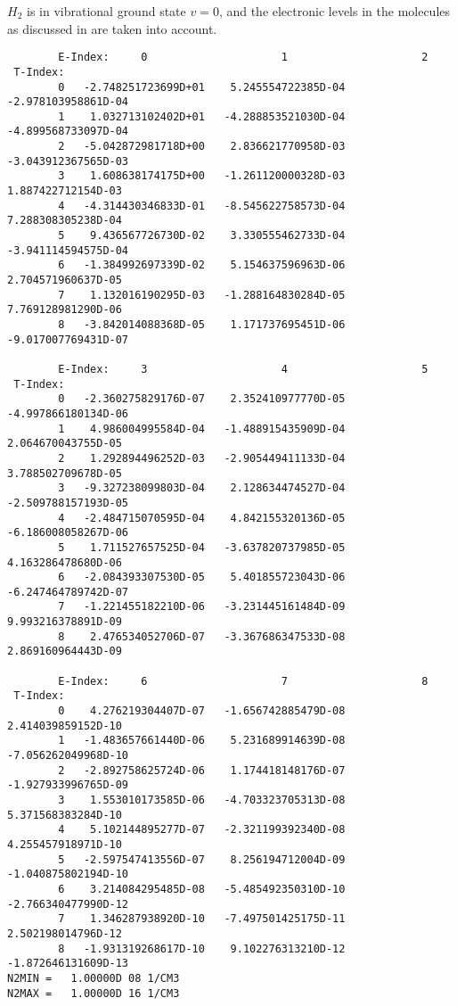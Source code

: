 \documentclass[12pt,dvipdfmx]{article}
\begin{document}
{$H_2$ is in vibrational ground state $v=0$, and the electronic levels
in the molecules as discussed in \cite{kn:Sawada} are taken into
account.


\begin{small}\begin{verbatim}
        E-Index:     0                     1                     2
 T-Index:
        0   -2.748251723699D+01    5.245554722385D-04   -2.978103958861D-04
        1    1.032713102402D+01   -4.288853521030D-04   -4.899568733097D-04
        2   -5.042872981718D+00    2.836621770958D-03   -3.043912367565D-03
        3    1.608638174175D+00   -1.261120000328D-03    1.887422712154D-03
        4   -4.314430346833D-01   -8.545622758573D-04    7.288308305238D-04
        5    9.436567726730D-02    3.330555462733D-04   -3.941114594575D-04
        6   -1.384992697339D-02    5.154637596963D-06    2.704571960637D-05
        7    1.132016190295D-03   -1.288164830284D-05    7.769128981290D-06
        8   -3.842014088368D-05    1.171737695451D-06   -9.017007769431D-07

        E-Index:     3                     4                     5
 T-Index:
        0   -2.360275829176D-07    2.352410977770D-05   -4.997866180134D-06
        1    4.986004995584D-04   -1.488915435909D-04    2.064670043755D-05
        2    1.292894496252D-03   -2.905449411133D-04    3.788502709678D-05
        3   -9.327238099803D-04    2.128634474527D-04   -2.509788157193D-05
        4   -2.484715070595D-04    4.842155320136D-05   -6.186008058267D-06
        5    1.711527657525D-04   -3.637820737985D-05    4.163286478680D-06
        6   -2.084393307530D-05    5.401855723043D-06   -6.247464789742D-07
        7   -1.221455182210D-06   -3.231445161484D-09    9.993216378891D-09
        8    2.476534052706D-07   -3.367686347533D-08    2.869160964443D-09

        E-Index:     6                     7                     8
 T-Index:
        0    4.276219304407D-07   -1.656742885479D-08    2.414039859152D-10
        1   -1.483657661440D-06    5.231689914639D-08   -7.056262049968D-10
        2   -2.892758625724D-06    1.174418148176D-07   -1.927933996765D-09
        3    1.553010173585D-06   -4.703323705313D-08    5.371568383284D-10
        4    5.102144895277D-07   -2.321199392340D-08    4.255457918971D-10
        5   -2.597547413556D-07    8.256194712004D-09   -1.040875802194D-10
        6    3.214084295485D-08   -5.485492350310D-10   -2.766340477990D-12
        7    1.346287938920D-10   -7.497501425175D-11    2.502198014796D-12
        8   -1.931319268617D-10    9.102276313210D-12   -1.872646131609D-13
N2MIN =   1.00000D 08 1/CM3
N2MAX =   1.00000D 16 1/CM3


\end{verbatim}
\end{small}}
\end{document}
